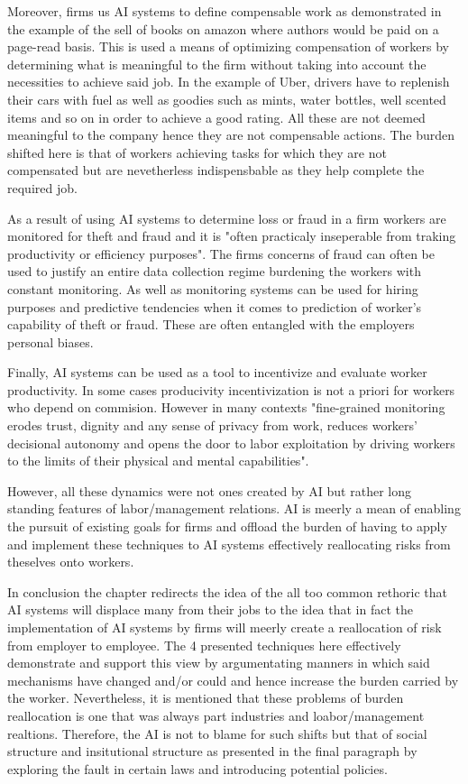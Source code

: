 \documentclass[a4paper,11pt,oneside]{report}
\begin{document}
Moreover, firms us AI systems to define compensable work as demonstrated in the example of the sell of books on amazon where authors would be paid on a page-read basis. This is used a means of optimizing compensation of workers by determining what is meaningful to the firm without taking into account the necessities to achieve said job. In the example of Uber, drivers have to replenish their cars with fuel as well as goodies such as  mints, water bottles, well scented items and so on in order to achieve a good rating. All these are not deemed meaningful to the company hence they are not compensable actions. The burden shifted here is that of workers achieving tasks for which they are not compensated but are nevetherless indispensbable as they help complete the required job.

As a result of using AI systems to determine loss or fraud in a firm workers are monitored for theft and fraud and it is "often practicaly inseperable from traking productivity or efficiency purposes". The firms concerns of fraud can often be used to justify an entire data collection regime burdening the workers with constant monitoring. As well as monitoring systems can be used for hiring purposes and predictive tendencies when it comes to prediction of worker's capability of theft or fraud. These are often entangled with the employers personal biases. 

Finally, AI systems can be used as a tool to incentivize and evaluate worker productivity. In some cases producivity incentivization is not a priori for workers who depend on commision. However in many contexts "fine-grained monitoring erodes trust, dignity and any sense of privacy from work, reduces workers' decisional autonomy and opens the door to labor exploitation by driving workers to the limits of their physical and mental capabilities".

However, all these dynamics were not ones created by AI but rather long standing features of labor/management relations. AI is meerly a mean of enabling the pursuit of existing goals for firms and offload the burden of having to apply and implement these techniques to AI systems effectively reallocating risks from theselves onto workers.

In conclusion the chapter redirects the idea of the all too common rethoric that AI systems will displace many from their jobs to the idea that in fact the implementation of AI systems by firms will meerly create a reallocation of risk from employer to employee. The 4 presented techniques here effectively demonstrate and support this view by argumentating manners in which said mechanisms have changed and/or could and hence increase the burden carried by the worker. Nevertheless, it is mentioned that these problems of burden reallocation is one that was always part industries and loabor/management realtions. Therefore, the AI is not to blame for such shifts but that of social structure and insitutional structure as presented in the final paragraph by exploring the fault in certain laws and introducing potential policies.
\end{document}

